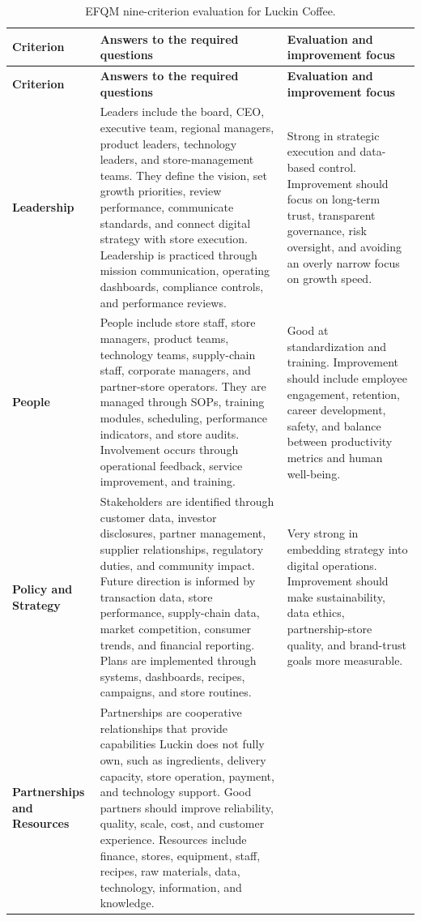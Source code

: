 \documentclass[12pt,a4paper]{article}
\begin{document}
\begin{longtable}{P{2.65cm}P{5.45cm}P{5.95cm}}
\caption{EFQM nine-criterion evaluation for Luckin Coffee.}\\
\toprule
\textbf{Criterion} & \textbf{Answers to the required questions} & \textbf{Evaluation and improvement focus} \\
\midrule
\endfirsthead
\toprule
\textbf{Criterion} & \textbf{Answers to the required questions} & \textbf{Evaluation and improvement focus} \\
\midrule
\endhead
\bottomrule
\endlastfoot
\textbf{Leadership} &
Leaders include the board, CEO, executive team, regional managers, product leaders, technology leaders, and store-management teams. They define the vision, set growth priorities, review performance, communicate standards, and connect digital strategy with store execution. Leadership is practiced through mission communication, operating dashboards, compliance controls, and performance reviews. &
Strong in strategic execution and data-based control. Improvement should focus on long-term trust, transparent governance, risk oversight, and avoiding an overly narrow focus on growth speed. \\
\midrule
\textbf{People} &
People include store staff, store managers, product teams, technology teams, supply-chain staff, corporate managers, and partner-store operators. They are managed through SOPs, training modules, scheduling, performance indicators, and store audits. Involvement occurs through operational feedback, service improvement, and training. &
Good at standardization and training. Improvement should include employee engagement, retention, career development, safety, and balance between productivity metrics and human well-being. \\
\midrule
\textbf{Policy and Strategy} &
Stakeholders are identified through customer data, investor disclosures, partner management, supplier relationships, regulatory duties, and community impact. Future direction is informed by transaction data, store performance, supply-chain data, market competition, consumer trends, and financial reporting. Plans are implemented through systems, dashboards, recipes, campaigns, and store routines. &
Very strong in embedding strategy into digital operations. Improvement should make sustainability, data ethics, partnership-store quality, and brand-trust goals more measurable. \\
\midrule
\textbf{Partnerships and Resources} &
Partnerships are cooperative relationships that provide capabilities Luckin does not fully own, such as ingredients, delivery capacity, store operation, payment, and technology support. Good partners should improve reliability, quality, scale, cost, and customer experience. Resources include finance, stores, equipment, staff, recipes, raw materials, data, technology, information, and knowledge. &

\end{longtable}
\end{document}
